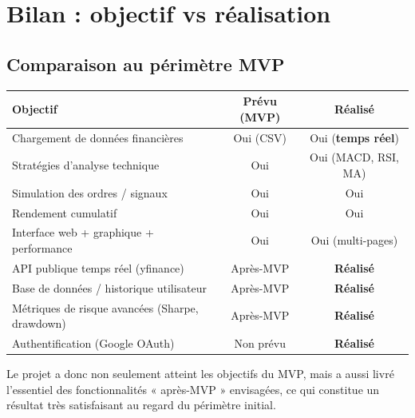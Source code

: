 \documentclass[11pt,a4paper]{article}
\begin{document}
\section{Bilan : objectif vs réalisation}
\label{sec:bilan}
\subsection{Comparaison au périmètre MVP}
\begin{center}
\begin{tabular}{@{}p{7.6cm}cc@{}}
\toprule
\textbf{Objectif} & \textbf{Prévu (MVP)} & \textbf{Réalisé} \\
\midrule
Chargement de données financières                 & Oui (CSV) & Oui (\textbf{temps réel}) \\
Stratégies d'analyse technique                    & Oui & Oui (MACD, RSI, MA) \\
Simulation des ordres / signaux                   & Oui & Oui \\
Rendement cumulatif                               & Oui & Oui \\
Interface web + graphique + performance           & Oui & Oui (multi-pages) \\
API publique temps réel (yfinance)                & Après-MVP & \textbf{Réalisé} \\
Base de données / historique utilisateur          & Après-MVP & \textbf{Réalisé} \\
Métriques de risque avancées (Sharpe, drawdown)   & Après-MVP & \textbf{Réalisé} \\
Authentification (Google OAuth)                    & Non prévu & \textbf{Réalisé} \\
\bottomrule
\end{tabular}
\end{center}
Le projet a donc non seulement atteint les objectifs du MVP, mais a aussi livré
l'essentiel des fonctionnalités « après-MVP » envisagées, ce qui constitue un
résultat très satisfaisant au regard du périmètre initial.
\end{document}

